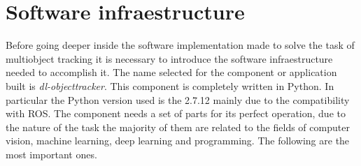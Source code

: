 \chapter{Software infraestructure}

Before going deeper inside the software implementation made to solve the task of multiobject tracking it is necessary to introduce the software infraestructure needed to accomplish it. The name selected for the component or application built is \textit{dl-objecttracker}. This component is completely written in Python. In particular the Python version used is the 2.7.12 mainly due to the compatibility with ROS. The component needs a set of parts for its perfect operation, due to the nature of the task the majority of them are related to the fields of computer vision, machine learning, deep learning and programming. The following are the most important ones.

